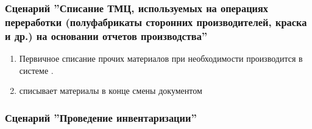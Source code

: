 





\subsubsection{Сценарий ''Списание ТМЦ, используемых на операциях переработки (полуфабрикаты сторонних производителей, краска и др.) на основании отчетов производства''}
\label{bp:storage_10}


\begin{enumerate}
\item Первичное списание прочих материалов при необходимости производится в системе \erp. 
\item \kladovshik списывает материалы в конце смены документом   
\end{enumerate}


\subsubsection{Сценарий ''Проведение инвентаризации''}
\label{bp:storage_11}


